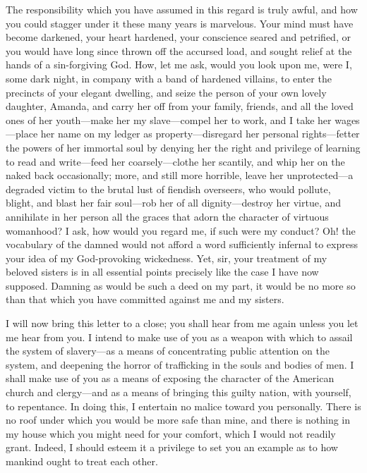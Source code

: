 The responsibility which you have assumed in this regard is truly awful,
and how you could stagger under it these many years is marvelous. Your
mind must have become darkened, your heart hardened, your conscience
seared and petrified, or you would have long since thrown off the
accursed load, and sought relief at the hands of a sin-forgiving God.
How, let me ask, would you look upon me, were I, some dark night, in
company with a band of hardened villains, to enter the precincts of your
elegant dwelling, and seize the person of your own lovely daughter,
Amanda, and carry her off from your family, friends, and all the loved
ones of her youth---make her my slave---compel her to work, and I take
her wages---place her name on my ledger as property---disregard her
personal rights---fetter the powers of her immortal soul by denying her
the right and privilege of learning to read and write---feed her
coarsely---clothe her scantily, and whip her on the naked back
occasionally; {}more, and still more horrible, leave her unprotected---a
degraded victim to the brutal lust of fiendish overseers, who would
pollute, blight, and blast her fair soul---rob her of all
dignity---destroy her virtue, and annihilate in her person all the
graces that adorn the character of virtuous womanhood? I ask, how would
you regard me, if such were my conduct? Oh! the vocabulary of the damned
would not afford a word sufficiently infernal to express your idea of my
God-provoking wickedness. Yet, sir, your treatment of my beloved sisters
is in all essential points precisely like the case I have now supposed.
Damning as would be such a deed on my part, it would be no more so than
that which you have committed against me and my sisters.

I will now bring this letter to a close; you shall hear from me again
unless you let me hear from you. I intend to make use of you as a weapon
with which to assail the system of slavery---as a means of concentrating
public attention on the system, and deepening the horror of trafficking
in the souls and bodies of men. I shall make use of you as a means of
exposing the character of the American church and clergy---and as a
means of bringing this guilty nation, with yourself, to repentance. In
doing this, I entertain no malice toward you personally. There is no
roof under which you would be more safe than mine, and there is nothing
in my house which you might need for your comfort, which I would not
readily grant. Indeed, I should esteem it a privilege to set you an
example as to how mankind ought to treat each other.

